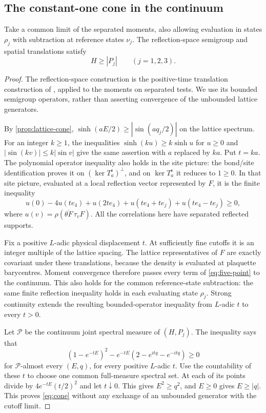 \documentclass[11pt,letterpaper,reqno]{amsart}
\makeatletter
\theoremstyle{definition}
\newcommand{\ms@minorstart}{%
  \pushQED{\qed}\renewcommand{\qedsymbol}{$\blacksquare$}}
\newenvironment{proposition}[1][]{\ms@minorstart\ms@proposition[#1]}
  {\popQED\endms@proposition}
\theoremstyle{remark}
\makeatother
\begin{document}
\subsection{The constant-one cone in the continuum}

\begin{proposition}[The continuum coordinate cones]\label{prop:continuum-cone}
Take a common limit of the separated moments, also allowing evaluation in
states $\rho_j$ with subtraction at reference states $\nu_j$.
The reflection-space semigroup and spatial translations satisfy
\begin{equation}\label{eq:cone}
 H\ge|P_j|\qquad(j=1,2,3).
\end{equation}
\end{proposition}

\begin{proof}
The reflection-space construction is the positive-time translation
construction of \cite[\S4.1, pp.~90--92]{OS1973}, applied to the
moments on separated tests. We use its bounded semigroup operators,
rather than asserting convergence of the unbounded lattice generators.

By \cref{prop:lattice-cone},
$\sinh(aE/2)\ge|\sin(aq_j/2)|$ on the lattice spectrum.
For an integer $k\ge1$, the inequalities
$\sinh(ku)\ge k\sinh u$ for $u\ge0$ and
$|\sin(kv)|\le k|\sin v|$ give the same assertion with $a$ replaced
by $ka$. Put $t=ka$. The polynomial operator inequality also holds
in the site picture: the bond/site identification proves it on
$(\ker T_a^{\mathrm s})^\perp$, and on $\ker T_a^{\mathrm s}$ it
reduces to $1\ge0$. In that site picture, evaluated at a local
reflection vector represented by $F$, it is the finite inequality
\begin{equation}\label{eq:five-point}
 u(0)-4u(te_4)+u(2te_4)
       +u(te_4+te_j)+u(te_4-te_j)\ge0,
\end{equation}
where $u(v)=\rho(\overline{\theta F}\,\tau_vF)$.
All the correlations here have separated reflected supports.

Fix a positive $L$-adic physical displacement $t$. At sufficiently fine
cutoffs it is an integer multiple of the lattice spacing. The lattice
representatives of $F$ are exactly covariant under these translations,
because the density is evaluated at plaquette barycentres. Moment
convergence therefore passes every term of \eqref{eq:five-point} to
the continuum. This also holds for the common reference-state
subtraction: the same finite reflection inequality holds in each
evaluating state $\rho_j$. Strong continuity extends the resulting
bounded-operator inequality from $L$-adic $t$ to every $t>0$.

Let $\mathcal P$ be the continuum joint spectral measure of $(H,P_j)$.
The inequality says that
\[
 (1-e^{-tE})^2
       -e^{-tE}(2-e^{itq}-e^{-itq})\ge0
\]
for $\mathcal P$-almost every $(E,q)$, for every positive $L$-adic
$t$. Use the countability of these $t$ to choose one common full-measure
spectral set. At each of its points divide by $4e^{-tE}(t/2)^2$ and
let $t\downarrow0$. This gives $E^2\ge q^2$, and $E\ge0$ gives
$E\ge|q|$. This proves \eqref{eq:cone} without any exchange of an
unbounded generator with the cutoff limit.
\end{proof}
\end{document}
